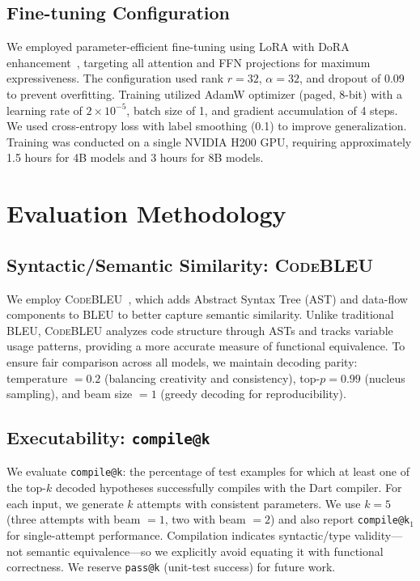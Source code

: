 \documentclass[10pt,conference]{IEEEtran}
\makeatletter
\newcommand{\codebleu}{\textsc{CodeBLEU}\xspace}
\newcommand{\compileatk}{\texttt{compile@k}\xspace}
\newcommand{\passatk}{\texttt{pass@k}\xspace}
\makeatother
\begin{document}
\subsection{Fine-tuning Configuration}
We employed parameter-efficient fine-tuning using LoRA with DoRA enhancement~\cite{dora2024}, targeting all attention and FFN projections for maximum expressiveness. The configuration used rank $r{=}32$, $\alpha{=}32$, and dropout of 0.09 to prevent overfitting. Training utilized AdamW optimizer (paged, 8-bit) with a learning rate of $2\times 10^{-5}$, batch size of 1, and gradient accumulation of 4 steps. We used cross-entropy loss with label smoothing (0.1) to improve generalization. Training was conducted on a single NVIDIA H200 GPU, requiring approximately 1.5 hours for 4B models and 3 hours for 8B models.

\section{Evaluation Methodology}

\subsection{Syntactic/Semantic Similarity: \codebleu}
We employ \codebleu{}~\cite{codebleu2021}, which adds Abstract Syntax Tree (AST) and data-flow components to BLEU to better capture semantic similarity. Unlike traditional BLEU, \codebleu{} analyzes code structure through ASTs and tracks variable usage patterns, providing a more accurate measure of functional equivalence. To ensure fair comparison across all models, we maintain decoding parity: temperature $= 0.2$ (balancing creativity and consistency), top-$p = 0.99$ (nucleus sampling), and beam size $= 1$ (greedy decoding for reproducibility).

\subsection{Executability: \compileatk}
We evaluate \compileatk{}: the percentage of test examples for which at least one of the top-$k$ decoded hypotheses successfully compiles with the Dart compiler. For each input, we generate $k$ attempts with consistent parameters. We use $k{=}5$ (three attempts with beam $= 1$, two with beam $= 2$) and also report \compileatk$_1$ for single-attempt performance. Compilation indicates syntactic/type validity—not semantic equivalence—so we explicitly avoid equating it with functional correctness. We reserve \passatk{} (unit-test success) for future work.
\end{document}
